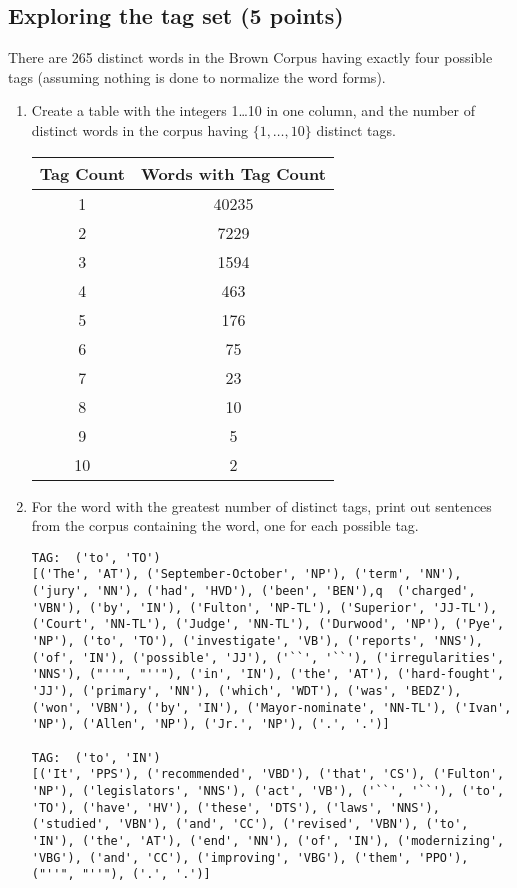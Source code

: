 \documentclass[11pt]{article}
\begin{document}
\subsection{Exploring the tag set (5 points)}
There are 265 distinct words in the Brown Corpus having exactly four possible tags (assuming nothing is done to normalize the word forms).
\begin{enumerate}
\item Create a table with the integers 1\dots 10 in one column, and the number of distinct
words in the corpus having $\{1, \dots, 10\}$ distinct tags.

\begin{center}
\begin{tabular}{|c|c|}
\hline
Tag Count & Words with Tag Count \\
\hline
1 &  40235 \\
\hline
2 &  7229 \\
\hline
3 &  1594 \\
\hline
4 &  463 \\
\hline
5 &  176 \\
\hline
6 &  75 \\
\hline
7 &  23 \\
\hline
8 &  10 \\
\hline
9 &  5 \\
\hline
10 & 2 \\
\hline
\end{tabular}
\end{center}

\item For the word with the greatest number of distinct tags, print out sentences from
the corpus containing the word, one for each possible tag.

\begin{lstlisting}
TAG:  ('to', 'TO')
[('The', 'AT'), ('September-October', 'NP'), ('term', 'NN'), ('jury', 'NN'), ('had', 'HVD'), ('been', 'BEN'),q  ('charged', 'VBN'), ('by', 'IN'), ('Fulton', 'NP-TL'), ('Superior', 'JJ-TL'), ('Court', 'NN-TL'), ('Judge', 'NN-TL'), ('Durwood', 'NP'), ('Pye', 'NP'), ('to', 'TO'), ('investigate', 'VB'), ('reports', 'NNS'), ('of', 'IN'), ('possible', 'JJ'), ('``', '``'), ('irregularities', 'NNS'), ("''", "''"), ('in', 'IN'), ('the', 'AT'), ('hard-fought', 'JJ'), ('primary', 'NN'), ('which', 'WDT'), ('was', 'BEDZ'), ('won', 'VBN'), ('by', 'IN'), ('Mayor-nominate', 'NN-TL'), ('Ivan', 'NP'), ('Allen', 'NP'), ('Jr.', 'NP'), ('.', '.')]

TAG:  ('to', 'IN')
[('It', 'PPS'), ('recommended', 'VBD'), ('that', 'CS'), ('Fulton', 'NP'), ('legislators', 'NNS'), ('act', 'VB'), ('``', '``'), ('to', 'TO'), ('have', 'HV'), ('these', 'DTS'), ('laws', 'NNS'), ('studied', 'VBN'), ('and', 'CC'), ('revised', 'VBN'), ('to', 'IN'), ('the', 'AT'), ('end', 'NN'), ('of', 'IN'), ('modernizing', 'VBG'), ('and', 'CC'), ('improving', 'VBG'), ('them', 'PPO'), ("''", "''"), ('.', '.')]


\end{lstlisting}
\end{enumerate}
\end{document}
